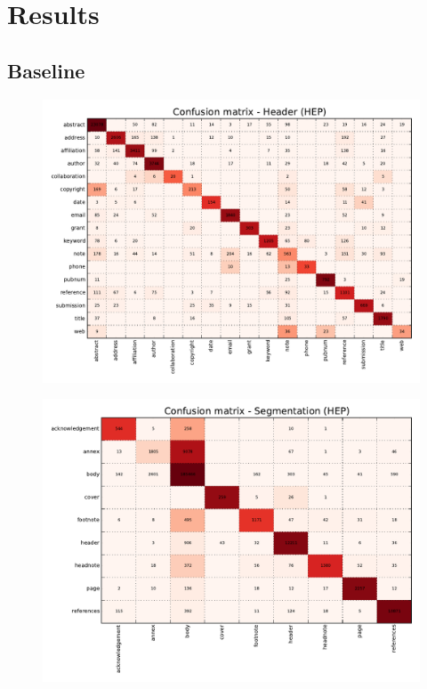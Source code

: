 \section{Results}

\subsection{Baseline}

\begin{figure}[h]
\center
\includegraphics[width=5.5in]{Figures/header_baseline_confusion.pdf}
\caption{}
\label{fig:header_baseline_confusion}
\end{figure}

\begin{figure}[h]
\center
\includegraphics[width=5.5in]{Figures/segmentation_baseline_confusion.pdf}
\caption{}
\label{fig:segmentation_baseline_confusion}
\end{figure}

